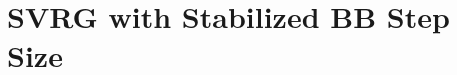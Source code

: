\documentclass[letterpaper]{article} %
\begin{document}
%		

\section{SVRG with Stabilized BB Step Size}
\end{document}
